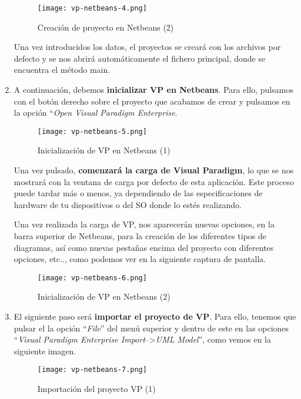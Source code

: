 \begin{enumerate}
    \begin{figure}[H]
        \centering
        \texttt{[image: vp-netbeans-4.png]}
        \caption{Creación de proyecto en Netbeans (2)}
    \end{figure}

    Una vez introducidos los datos, el proyectos se creará con los archivos por defecto y se nos abrirá automáticamente el fichero principal, donde se encuentra el método main.

    \item A continuación, debemos \textbf{inicializar VP en Netbeans}. Para ello, pulsamos con el botón derecho sobre el proyecto que acabamos de crear y pulsamos en la opción ``\textit{Open Visual Paradigm Enterprise}.

    \begin{figure}[H]
        \centering
        \texttt{[image: vp-netbeans-5.png]}
        \caption{Inicialización de VP en Netbeans (1)}
    \end{figure}

    Una vez pulsado, \textbf{comenzará la carga de Visual Paradigm}, lo que se nos mostrará con la ventana de carga por defecto de esta aplicación. Este proceso puede tardar más o menos, ya dependiendo de las especificaciones de hardware de tu dispositivos o  del SO donde lo estés realizando.

    Una vez realizada la carga de VP, nos aparecerán nuevas opciones, en la barra superior de Netbeans, para la creación de los diferentes tipos de diagramas, así como nuevas pestañas encima del proyecto con diferentes opciones, etc.., como podemos ver en la siguiente captura de pantalla.

    \begin{figure}[H]
        \centering
        \texttt{[image: vp-netbeans-6.png]}
        \caption{Inicialización de VP en Netbeans (2)}
    \end{figure}

    \item El siguiente paso será \textbf{importar el proyecto de VP}. Para ello, tenemos que pulsar el la opción ``\textit{File}'' del menú superior y dentro de este en las opciones ``\textit{Visual Paradigm Enterprise Import}-->\textit{UML Model}'', como vemos en la siguiente imagen.

    \begin{figure}[H]
        \centering
        \texttt{[image: vp-netbeans-7.png]}
        \caption{Importación del proyecto VP (1)}
    \end{figure}


\end{enumerate}
